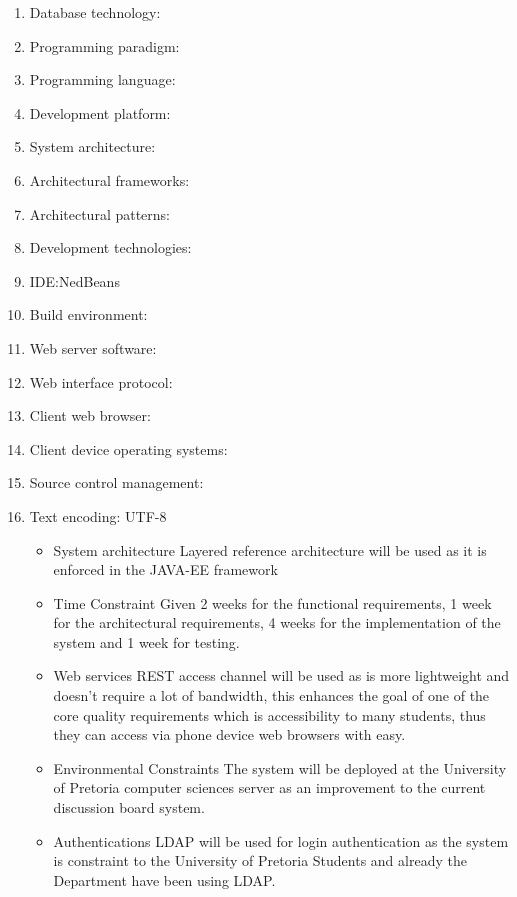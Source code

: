  
%

	\begin{enumerate}
		\item Database technology: 
		\item Programming paradigm: 
		\item Programming language: 
		\item Development platform:  
		\item System architecture: 
		\item Architectural frameworks: 
		\item Architectural patterns: 
		\item Development technologies:
		\item IDE:NedBeans
		\item Build environment:
		\item Web server software:
		\item Web interface protocol:
		\item Client web browser:
		\item Client device operating systems:
		\item Source control management: 
		\item Text encoding: UTF-8
		\begin{itemize}
		
		
			\item{System architecture}
				Layered reference architecture will be used as it is enforced in the JAVA-EE framework
				
			\item{Time Constraint }		
					Given 2 weeks for the functional requirements, 1 week for the architectural requirements, 4 weeks 							for the implementation of the system and 1 week for testing.	
					
		
			\item{Web services}		
				REST access channel will be used as is more lightweight and doesn’t require a lot of bandwidth, this 						enhances the goal of one of the core quality requirements which is accessibility to many students, 					thus they can access via phone device web browsers with easy.
				
				\item{Environmental Constraints}
					The system will be deployed at the University of Pretoria computer sciences server as an 									improvement to the current discussion board system.
					
					\item{Authentications}
					LDAP will be used for login authentication as the system is constraint to the University of 									Pretoria Students and already the Department have been using LDAP.
					

\end{itemize}
\end{enumerate}
